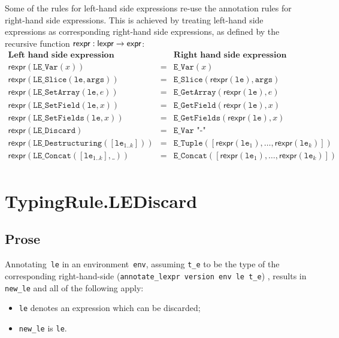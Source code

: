 \documentclass{book}
\newcommand\Ignore[0]{\texttt{\_}}
\newcommand\vle[0]{\texttt{le}}
\newcommand\torexpr[0]{\textsf{rexpr}}
\newcommand\vargs[0]{\texttt{args}}
\newcommand\leslice[0]{\texttt{LE\_Slice}} %
\begin{document}
Some of the rules for left-hand side expressions re-use the annotation rules for right-hand side expressions.
This is achieved by treating left-hand side expressions as corresponding right-hand side expressions,
as defined by the recursive function $\torexpr : \lexpr \rightarrow \expr$:
\[
\begin{array}{lcl}
  \textbf{Left hand side expression} & & \textbf{Right hand side expression}\\
  \hline
  \torexpr(\texttt{LE\_Var}(x)) &=& \texttt{E\_Var}(x)\\
  \torexpr(\leslice(\vle, \vargs)) &=& \texttt{E\_Slice}(\torexpr(\vle), \vargs)\\
  \torexpr(\texttt{LE\_SetArray}(\vle, e)) &=& \texttt{E\_GetArray}(\torexpr(\vle), e)\\
  \torexpr(\texttt{LE\_SetField}(\vle, x)) &=& \texttt{E\_GetField}(\torexpr(\vle), x)\\
  \torexpr(\texttt{LE\_SetFields}(\vle, x)) &=& \texttt{E\_GetFields}(\torexpr(\vle), x)\\
  \torexpr(\texttt{LE\_Discard}) &=& \texttt{E\_Var "-"}\\
  \torexpr(\texttt{LE\_Destructuring}([\vle_{1..k}])) &=& \texttt{E\_Tuple}([\torexpr(\vle_1),\ldots,\torexpr(\vle_k)])\\
  \torexpr(\texttt{LE\_Concat}([\vle_{1..k}], \Ignore)) &=& \texttt{E\_Concat}([\torexpr(\vle_1),\ldots,\torexpr(\vle_k)])\\
\end{array}
\]

\section{TypingRule.LEDiscard \label{sec:TypingRule.LEDiscard}}

  \subsection{Prose}
   Annotating~\texttt{le} in an environment~\texttt{env}, assuming
\texttt{t\_e} to be the type of the corresponding right-hand-side
(\texttt{annotate\_lexpr version env le t\_e}) , results in \texttt{new\_le} and
all of the following apply:
   \begin{itemize}
   \item \texttt{le} denotes an expression which can be discarded;
   \item \texttt{new\_le} is \texttt{le}.
   \end{itemize}
\end{document}
